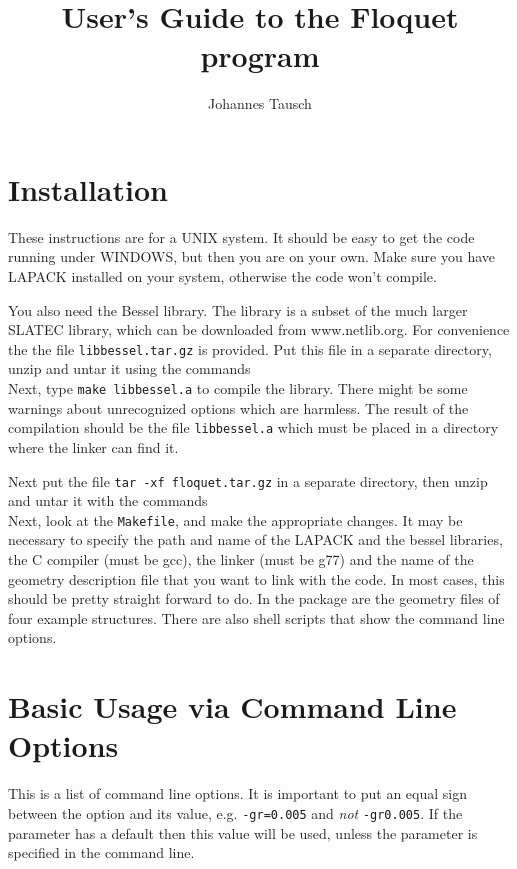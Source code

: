 \documentclass{article}
\title{User's Guide to the Floquet program}
\author{Johannes Tausch}
\begin{document}
\maketitle

\section{Installation}
These instructions are for a UNIX system. It should be easy to get the
code running under WINDOWS, but then you are on your own.
Make sure you have LAPACK installed on your system, otherwise the code
won't compile. 

You also need the Bessel library. The library is a subset of the much
larger SLATEC library, which can be downloaded from www.netlib.org.
For convenience the the file \texttt{libbessel.tar.gz} is provided.
Put this file in a separate directory,
unzip and untar it using the commands\\
 Next, type \texttt{make
  libbessel.a} to compile the library. There might be some warnings
about unrecognized options which are harmless. The result of the
compilation should be the file \texttt{libbessel.a} which must be
placed in a directory where the linker can find it.

Next put the file \texttt{tar -xf floquet.tar.gz} in a separate
directory, then unzip and untar it with the commands\\
 Next, look at the
\texttt{Makefile}, and make the appropriate changes.  It may be
necessary to specify the path and name of the LAPACK and the bessel
libraries, the C compiler (must be gcc), the linker (must be g77) and
the name of the geometry description file that you want to link with
the code. In most cases, this should be pretty straight forward to do.
In the package are the geometry files of four example structures.
There are also shell scripts that show the command line options.

\section{Basic Usage via Command Line Options}
This is a list of command line options. It is important to put an
equal sign between the option and its value, e.g. \texttt{-gr=0.005}
and \emph{not} \texttt{-gr0.005}. If the parameter has a default
then this value will be used, unless the parameter is
specified in the command line. 
\end{document}
